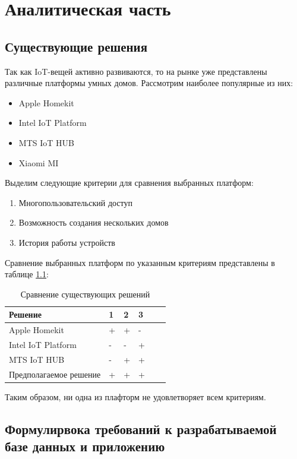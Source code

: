 \chapter{Аналитическая часть}

\section{Существующие решения}

Так как IoT-вещей активно развиваются, то на рынке уже представлены различные платформы умных домов. 
Рассмотрим наиболее популярные из них:
\begin{itemize}
    \item Apple Homekit
    \item Intel IoT Platform
    \item MTS IoT HUB
    \item Xiaomi MI
\end{itemize}

Выделим следующие критерии для сравнения выбранных платформ:
\begin{enumerate}
    \item[1)] Многопользовательский доступ
    \item[2)] Возможность создания нескольких домов
    \item[3)] История работы устройств
\end{enumerate}

Сравнение выбранных платформ по указанным критериям представлены в таблице \ref{tab:solutions}:
\begin{table}[!ht]
    \centering
    \caption{\label{tab:solutions} Сравнение существующих решений}
    \begin{tabular}{|l|l|l|l|l|l|}
    \hline
        Решение & 1 & 2 & 3  \\ \hline
        Apple Homekit & + & + & - \\ \hline
        Intel IoT Platform & - & - & + \\ \hline
        MTS IoT HUB & - & + & + \\ \hline
        Предполагаемое решение & + & + & + \\ \hline
    \end{tabular}
\end{table}

Таким образом, ни одна из плафторм не удовлетворяет всем критериям. 

\section{Формулирвока требований к разрабатываемой базе данных и приложению}

